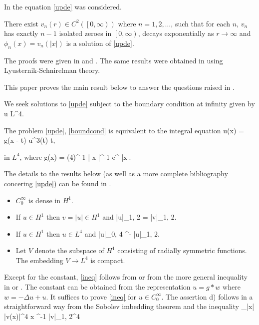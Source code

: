 In \cite{finkelstein} the equation \eqref{upde} was considered.

\begin{lemma}\label{coff1}
There exist $v_n(r) \in C^2\left( \left[0, \infty \right) \right)$ where $n=1, 2,
\ldots$, such that for each $n$, $v_n$ has exactly $n-1$ isolated zeroes in
$\left[0, \infty \right)$, decays exponentially as $r\to\infty$ and $\phi_n(x) =
v_n(|x|)$ is a solution of \eqref{upde}.
\end{lemma}

The proofs were given in %
\cite{nehari} and \cite{ryder}. The same
results were obtained in \cite{berger} using Lyusternik-Schnirelman theory.

This paper proves the main result %
below to answer the questions raised in \cite{robinson}.

We seek solutions to \eqref{upde} subject to the boundary condition at infinity
given by
\be\label{boundcond} u \in L^4. \ee

The problem \eqref{upde}, \eqref{boundcond} is equivalent to the integral
equation
\be\label{inteq} u(x) = \intrrr g(x - t) u^3(t) \diff t, \ee

in $L^4$, where
\be\label{testfunc} g(x) = (4\pi)^{-1} \left| x \right|^{-1} e^{-|x|}. \ee

The details to the results below (as well as a more complete bibliography
concering \eqref{upde}) can be found in \cite{coffmcarn}.

\begin{itemize}
\item $C_0^\infty$ is dense in $H^1$.
\item If $u \in H^1$ then $v = |u| \in H^1$ and
\be |u|_{1, 2} = |v|_{1, 2}. \ee
\item If $u \in H^1$ then $u \in L^4$ and
\be\label{ineq} |u|_{0, 4} ^{-\half} |u|_{1, 2}. \ee
\item Let $V$ denote the subspace of $H^1$ consisting of radially symmetric
functions. The embedding $V \to L^4$ is compact.
\end{itemize}

Except for the constant, \eqref{ineq} follows from \cite{Ladyzhenskaya} or from
the more general inequality in \cite{nirenberg} or \cite{friedman}. The constant
can be obtained from the representation $u = g\ast w$ where $w = - \Delta u +
u$. It suffices to prove \eqref{ineq} for $u \in C_0^\infty$. The assertion d)
follows in a straightforward way from the Sobolev imbedding theorem and the
inequality
\pi \int_{|x|\geq \rho} |v(x)|^4 \diff x \rho^{-1} |v|_{1, 2}^4 \ee

